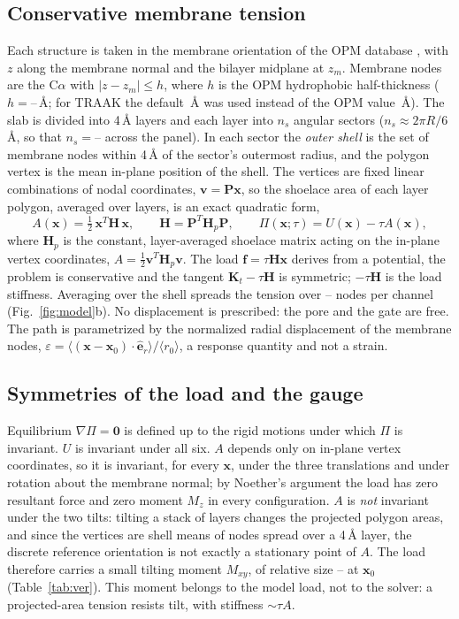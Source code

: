 \documentclass[preprint,12pt,a4paper]{elsarticle}
\newcommand{\x}{\mathbf{x}}
\newcommand{\Kt}{\mathbf{K}_t}
\newcommand{\Hm}{\mathbf{H}}
\newcommand{\eps}{\varepsilon}
\begin{document}
\subsection{Conservative membrane tension}
\label{sec:load}
Each structure is taken in the membrane orientation of the OPM database \citep{lomize2006}, with $z$ along the membrane normal and the bilayer midplane at $z_m$. Membrane nodes are the C$\alpha$ with $|z-z_m|\le h$, where $h$ is the OPM hydrophobic half-thickness ($h=$--\,\AA; for TRAAK the default \,\AA{} was used instead of the OPM value \,\AA). The slab is divided into 4\,\AA{} layers and each layer into $n_s$ angular sectors ($n_s\approx2\pi R/6$\,\AA, so that $n_s=$-- across the panel). In each sector the \emph{outer shell} is the set of membrane nodes within 4\,\AA{} of the sector's outermost radius, and the polygon vertex is the mean in-plane position of the shell. The vertices are fixed linear combinations of nodal coordinates, $\mathbf{v}=\mathbf{P}\x$, so the shoelace area of each layer polygon, averaged over layers, is an exact quadratic form,
\begin{equation}
A(\x)=\tfrac12\,\x^{T}\Hm\,\x,\qquad \Hm=\mathbf{P}^{T}\Hm_p\mathbf{P},\qquad
\Pi(\x;\tau)=U(\x)-\tau A(\x),
\label{eq:A}
\end{equation}
where $\Hm_p$ is the constant, layer-averaged shoelace matrix acting on the in-plane vertex coordinates, $A=\tfrac12\mathbf{v}^T\Hm_p\mathbf{v}$. The load $\mathbf{f}=\tau\Hm\x$ derives from a potential, the problem is conservative and the tangent $\Kt-\tau\Hm$ is symmetric; $-\tau\Hm$ is the load stiffness. Averaging over the shell spreads the tension over -- nodes per channel (Fig.~\ref{fig:model}b). No displacement is prescribed: the pore and the gate are free. The path is parametrized by the normalized radial displacement of the membrane nodes, $\eps=\langle(\x-\x_0)\cdot\hat{\mathbf{e}}_r\rangle/\langle r_0\rangle$, a response quantity and not a strain.

\subsection{Symmetries of the load and the gauge}
\label{sec:gauge}
Equilibrium $\nabla\Pi=\mathbf{0}$ is defined up to the rigid motions under which $\Pi$ is invariant. $U$ is invariant under all six. $A$ depends only on in-plane vertex coordinates, so it is invariant, for every $\x$, under the three translations and under rotation about the membrane normal; by Noether's argument the load has zero resultant force and zero moment $M_z$ in every configuration. $A$ is \emph{not} invariant under the two tilts: tilting a stack of layers changes the projected polygon areas, and since the vertices are shell means of nodes spread over a 4\,\AA{} layer, the discrete reference orientation is not exactly a stationary point of $A$. The load therefore carries a small tilting moment $M_{xy}$, of relative size -- at $\x_0$ (Table~\ref{tab:ver}). This moment belongs to the model load, not to the solver: a projected-area tension resists tilt, with stiffness $\sim\tau A$.
\end{document}
